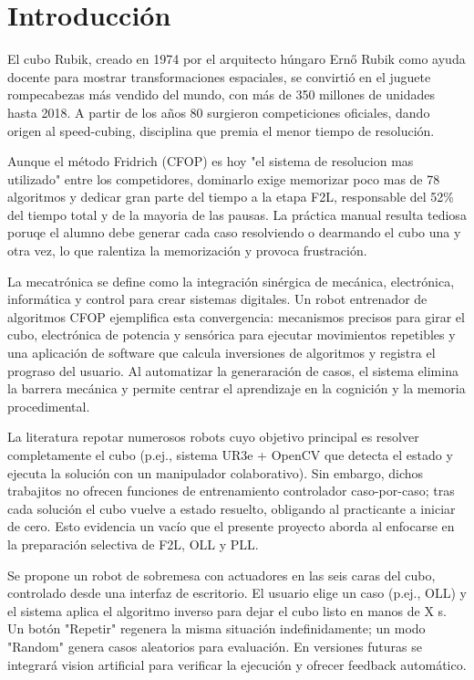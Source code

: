 \section{Introducción}
El cubo Rubik, creado en 1974 por el arquitecto húngaro Ernő Rubik como ayuda docente para mostrar transformaciones espaciales, se convirtió en el juguete rompecabezas más vendido del mundo, con más de 350 millones de unidades hasta 2018\cite{SGM2023}. A partir de los años 80 surgieron competiciones oficiales, dando origen al speed-cubing, disciplina que premia el menor tiempo de resolución.

Aunque el método Fridrich (CFOP) es hoy "el sistema de resolucion mas utilizado" entre los competidores\cite{SGM2023}, dominarlo exige memorizar poco mas de 78 algoritmos y dedicar gran parte del tiempo a la etapa F2L, responsable del 52\% del tiempo total y de la mayoria de las pausas\cite{SGM2023}. La práctica manual resulta tediosa poruqe el alumno debe generar cada caso resolviendo o dearmando el cubo una y otra vez, lo que ralentiza la memorización y provoca frustración.

La mecatrónica se define como la integración sinérgica de mecánica, electrónica, informática y control para crear sistemas digitales\cite{SGM2023}. Un robot entrenador de algoritmos CFOP ejemplifica esta convergencia: mecanismos precisos para girar el cubo, electrónica de potencia y sensórica para ejecutar movimientos repetibles y una aplicación de software que calcula inversiones de algoritmos y registra el prograso del usuario. Al automatizar la generaración de casos, el sistema elimina la barrera mecánica y permite centrar el aprendizaje en la cognición y la memoria procedimental. 

La literatura repotar numerosos robots cuyo objetivo principal es resolver completamente el cubo (p.ej., sistema UR3e + OpenCV que detecta el estado y ejecuta la solución con un manipulador colaborativo\cite{SGM2023}). Sin embargo, dichos trabajitos no ofrecen funciones de entrenamiento controlador caso-por-caso; tras cada solución el cubo vuelve a estado resuelto, obligando al practicante a iniciar de cero. Esto evidencia un vacío que el presente proyecto aborda al enfocarse en la preparación selectiva de F2L, OLL y PLL.

Se propone un robot de sobremesa con actuadores en las seis caras del cubo, controlado desde una interfaz de escritorio. El usuario elige un caso (p.ej., OLL) y el sistema aplica el algoritmo inverso para dejar el cubo listo en manos de X s. Un botón "Repetir" regenera la misma situación indefinidamente; un modo "Random" genera casos aleatorios para evaluación. En versiones futuras se integrará vision artificial para verificar la ejecución y ofrecer feedback automático.

